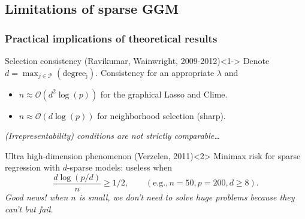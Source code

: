 \subsection{Limitations of sparse GGM}

\begin{frame}
  \frametitle{Practical implications of theoretical results}

  \begin{block}{Selection    consistency    (Ravikumar,    Wainwright,
      2009-2012)}<1->                                           Denote
    $d=\max_{j\in\mathcal{P}}(\mathrm{degree_j})$.  Consistency for an
    appropriate $\lambda$ and
    \begin{itemize}
    \item  $n\approx\mathcal{O}(d^2\log(p))$ for  the graphical  Lasso
      and Clime.
    \item $n\approx\mathcal{O}(d\log(p))$  for   neighborhood
      selection (sharp).
    \end{itemize}
    \textit{(Irrepresentability) conditions are not strictly
    comparable\dots}
  \end{block}

  \vfill

  \begin{block}{Ultra high-dimension phenomenon (Verzelen,  2011)}<2>
    Minimax risk for sparse regression with $d$-sparse models: useless
    when
    \begin{equation*}
    \frac{d \log(p/d)}{n} \geq 1/2, \qquad (\mathrm{e.g.}, n=50, p=200, d\geq 8).
    \end{equation*}
    \textit{Good news! when $n$ is small, we don't need to solve
      huge problems because they can't but fail.}
  \end{block}

\end{frame}

